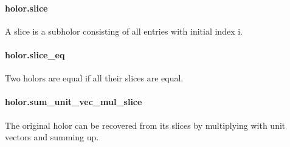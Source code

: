 \documentclass{article}
\begin{document}
\paragraph{holor.slice}
\par
A slice is a subholor consisting of all entries with initial index i.
\paragraph{holor.slice\_eq}
\par
Two holors are equal if all their slices are equal.
\paragraph{holor.sum\_unit\_vec\_mul\_slice}
\par
The original holor can be recovered from its slices by multiplying with unit vectors and summing up.
\end{document}
